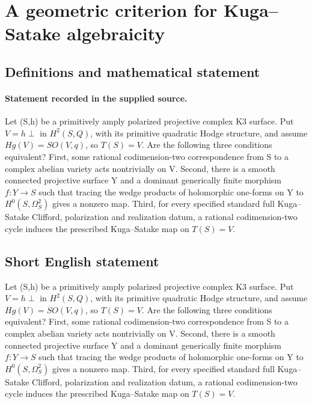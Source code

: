 \documentclass[11pt]{article}
\begin{document}
\section*{A geometric criterion for Kuga–Satake algebraicity}\label{30007041}
\subsection{Definitions and mathematical statement}
\paragraph{Statement recorded in the supplied source.}
Let (S,h) be a primitively amply polarized projective complex K3 surface. Put $V=h\perp $ in $H^{2}(S,Q)$, with its primitive quadratic Hodge structure, and assume $Hg(V)=SO(V,q)$, so $T(S)=V$. Are the following three conditions equivalent? First, some rational codimension-two correspondence from S to a complex abelian variety acts nontrivially on V. Second, there is a smooth connected projective surface Y and a dominant generically finite morphism $f:Y\to S$ such that tracing the wedge products of holomorphic one-forms on Y to $H^{0}(S,\Omega ^{2}_S)$ gives a nonzero map. Third, for every specified standard full Kuga–Satake Clifford, polarization and realization datum, a rational codimension-two cycle induces the prescribed Kuga–Satake map on $T(S)=V$.
\subsection{Short English statement}
Let (S,h) be a primitively amply polarized projective complex K3 surface. Put $V=h\perp $ in $H^{2}(S,Q)$, with its primitive quadratic Hodge structure, and assume $Hg(V)=SO(V,q)$, so $T(S)=V$. Are the following three conditions equivalent? First, some rational codimension-two correspondence from S to a complex abelian variety acts nontrivially on V. Second, there is a smooth connected projective surface Y and a dominant generically finite morphism $f:Y\to S$ such that tracing the wedge products of holomorphic one-forms on Y to $H^{0}(S,\Omega ^{2}_S)$ gives a nonzero map. Third, for every specified standard full Kuga–Satake Clifford, polarization and realization datum, a rational codimension-two cycle induces the prescribed Kuga–Satake map on $T(S)=V$.
\end{document}
